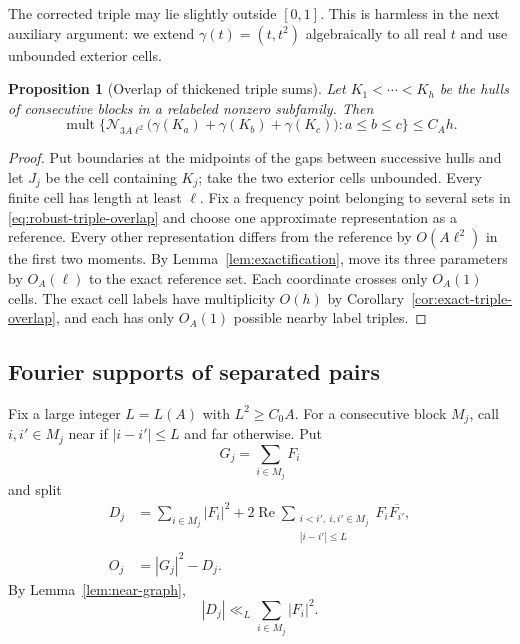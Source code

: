 \documentclass{amsart}
\numberwithin{equation}{section}
\newtheorem{proposition}[theorem]{Proposition}
\begin{document}
The corrected triple may lie slightly outside $[0,1]$.  This is harmless in
the next auxiliary argument: we extend $\gamma(t)=(t,t^2)$ algebraically to
all real $t$ and use unbounded exterior cells.

\begin{proposition}[Overlap of thickened triple sums]\label{prop:robust-triple-overlap}
Let $K_1<\cdots<K_h$ be the hulls of consecutive blocks in a relabeled
nonzero subfamily.  Then
\begin{equation}\label{eq:robust-triple-overlap}
 \operatorname{mult}\Big\{
 \mathcal N_{3A\ell^2}
   \big(\gamma(K_a)+\gamma(K_b)+\gamma(K_c)\big):
 a\le b\le c\Big\}
 \le C_Ah.
\end{equation}
\end{proposition}

\begin{proof}
Put boundaries at the midpoints of the gaps between successive hulls and let
$J_j$ be the cell containing $K_j$; take the two exterior cells unbounded.
Every finite cell has length at least $\ell$.  Fix a frequency point belonging
to several sets in \eqref{eq:robust-triple-overlap} and choose one approximate
representation as a reference.  Every other representation differs from the
reference by $O(A\ell^2)$ in the first two moments.  By
Lemma~\ref{lem:exactification}, move its three parameters by $O_A(\ell)$ to the
exact reference set.  Each coordinate crosses only $O_A(1)$ cells.  The
exact cell labels have multiplicity $O(h)$ by
Corollary~\ref{cor:exact-triple-overlap}, and each has only $O_A(1)$ possible nearby
label triples.
\end{proof}


\medskip 

\subsection{Fourier supports of separated pairs}

Fix a large integer $L=L(A)$ with $L^2\ge C_0A$.  For a consecutive block
$M_j$, call $i,i'\in M_j$ near if $|i-i'|\le L$ and far otherwise.  Put
\[
 G_j=\sum_{i\in M_j}F_i
\]
and split
\begin{align}
 D_j&=\sum_{i\in M_j}|F_i|^2
 +2\operatorname{Re}
  \sum_{\substack{i<i',\ i,i'\in M_j\\
        |i-i'|\le L}}
       F_i\overline{F_{i'}},\label{eq:parabola-D}\\
 O_j&=|G_j|^2-D_j.\label{eq:parabola-O}
\end{align}
By Lemma~\ref{lem:near-graph},
\begin{equation}\label{eq:D-pointwise}
 |D_j|\ll_L\sum_{i\in M_j}|F_i|^2.
\end{equation}
\end{document}
